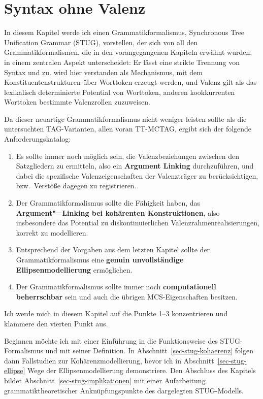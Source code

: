 \chapter{Syntax ohne Valenz} \label{ch-ohne-valenz}

In diesem Kapitel werde ich einen Grammatikformalismus, Synchronous Tree Unification Grammar (STUG), vorstellen, der sich von all den Grammatikformalismen, die in den vorangegangenen Kapiteln erwähnt wurden, in einem zentralen Aspekt unterscheidet: Er lässt eine strikte Trennung von Syntax und  zu.  wird hier verstanden als Mechanismus, mit dem Konstituentenstrukturen über Worttoken erzeugt werden, und Valenz gilt als das lexikalisch determinierte Potential von Worttoken, anderen kookkurrenten Worttoken bestimmte Valenzrollen zuzuweisen.  

Da dieser neuartige Grammatikformalismus nicht weniger leisten sollte als die untersuchten TAG-Varianten, allen voran TT-MCTAG, ergibt sich der folgende Anforderungskatalog:
\begin{enumerate}
  \item Es sollte immer noch möglich sein, die Valenzbeziehungen zwischen den Satzgliedern zu ermitteln, also ein {\bf Argument Linking} durchzuführen, und dabei die spezifische Valenzeigenschaften der Valenzträger zu berücksichtigen, bzw.\ Verstö\ss e dagegen zu registrieren. 
  \item Der Grammatikformalismus sollte die Fähigkeit haben, das {\bf Argument"=Linking bei kohärenten Konstruktionen}, also insbesondere das Potential zu diskontinuierlichen Valenzrahmenrealisierungen, korrekt zu modellieren. 
  \item Entsprechend der Vorgaben aus dem letzten Kapitel sollte der Grammatikformalismus eine {\bf genuin unvollständige Ellipsenmodellierung} ermöglichen.
  \item Der Grammatikformalismus sollte immer noch {\bf computationell beherrschbar} sein und auch die übrigen MCS-Eigenschaften besitzen.
\end{enumerate}
Ich werde mich in diesem Kapitel auf die Punkte 1--3 konzentrieren und klammere den vierten Punkt aus.

Beginnen möchte ich mit einer Einführung in die Funktionsweise des STUG-Formalismus und mit seiner Definition. In Abschnitt~\ref{sec-stug-kohaerenz} folgen dann Fallstudien zur Kohärenzmodellierung, bevor ich in Abschnitt~\ref{sec-stug-ellipse} Wege der Ellipsenmodellierung demonstriere. Den Abschluss des Kapitels bildet Abschnitt~\ref{sec-stug-implikationen} mit einer Aufarbeitung grammatiktheoretischer Anknüpfungspunkte des dargelegten STUG-Modells.


